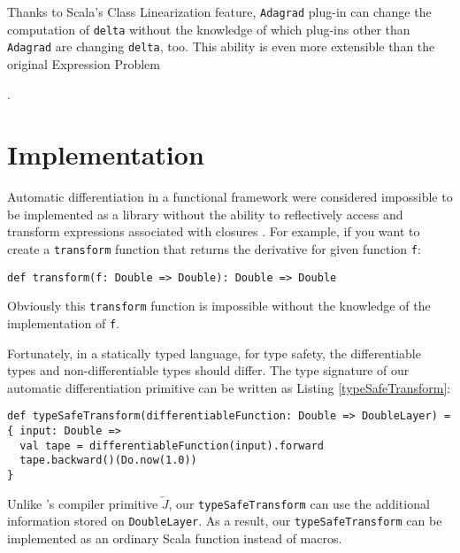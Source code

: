 Thanks to Scala's Class Linearization \cite{odersky2017scala} feature, \lstinline{Adagrad} \gls{plug-in} can change the computation of \lstinline{delta} without the knowledge of which \glspl{plug-in} other than \lstinline{Adagrad} are changing \lstinline{delta}, too. This ability is even more extensible than the original Expression Problem\begin{anonsuppress} \cite{yang2017expression}
\end{anonsuppress}
.

\section{Implementation\label{implementation}}

Automatic differentiation in a functional framework were considered impossible to be implemented as a library without the ability to reflectively access and
transform expressions associated with closures \cite{pearlmutter2008reverse}. For example, if you want to create a \lstinline{transform} function that returns the derivative for given function \lstinline{f}:

\begin{lstlisting}[float={htbp},caption={Impossible transform function for automatic differentiation}, label={transform}]
def transform(f: Double => Double): Double => Double
\end{lstlisting}

Obviously this \lstinline{transform} function is impossible without the knowledge of the implementation of \lstinline{f}.

Fortunately, in a statically typed language, for type safety, the differentiable types and non-differentiable types should differ. The type signature of our automatic differentiation primitive can be written as Listing \ref{typeSafeTransform}:

\begin{lstlisting}[float={htbp},caption={Type safe transform function for automatic differentiation}, label={typeSafeTransform}]
def typeSafeTransform(differentiableFunction: Double => DoubleLayer) = { input: Double =>
  val tape = differentiableFunction(input).forward
  tape.backward()(Do.now(1.0))
}
\end{lstlisting}

Unlike \cite{pearlmutter2008reverse}'s compiler primitive $\overleftarrow{J}$, our \lstinline{typeSafeTransform} can use the additional information stored on \lstinline{DoubleLayer}. As a result, our \lstinline{typeSafeTransform} can be implemented as an ordinary Scala function instead of macros.

